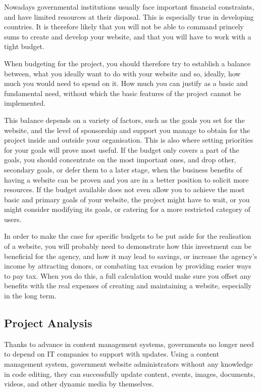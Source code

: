 Nowadays governmental institutions usually face important financial constraints, and have limited resources at their disposal. This is especially true in developing countries. It is therefore likely that you will not be able to command princely sums to create and develop your website, and that you will have to work with a tight budget.

When budgeting for the project, you should therefore try to establish a balance between, what you ideally want to do with your website and so, ideally, how much you would need to spend on it. How much you can justify as a basic and fundamental need, without which the basic features of the project cannot be implemented.

This balance depends on a variety of factors, such as the goals you set for the website, and the level of sponsorship and support you manage to obtain for the project inside and outside your organisation. This is also where setting priorities for your goals will prove most useful. If the budget only covers a part of the goals, you should concentrate on the most important ones, and drop other, secondary goals, or defer them to a later stage, when the business benefits of having a website can be proven and you are in a better position to solicit more resources. If the budget available does not even allow you to achieve the most basic and primary goals of your website, the project might have to wait, or you might consider modifying its goals, or catering for a more restricted category of users.

In order to make the case for specific budgets to be put aside for the realisation of a website, you will probably need to demonstrate how this investment can be beneficial for the agency, and how it may lead to savings, or increase the agency's income by attracting donors, or combating tax evasion by providing easier ways to pay tax. When you do this, a full calculation would make sure you offset any benefits with the real expenses of creating and maintaining a website, especially in the long term.

\subsection{Project Analysis}
Thanks to advance in content management systems, governments no longer need to depend on IT companies to support with updates. Using a content management system, government website administrators without any knowledge in code editing, they can successfully update content, events,  images, documents, videos, and other dynamic media by themselves.

